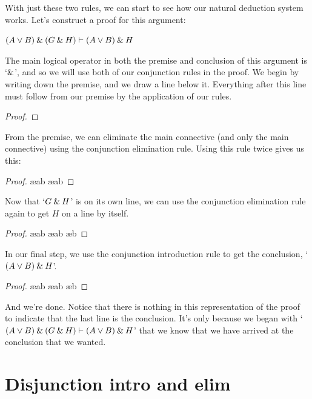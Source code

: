 With just these two rules, we can start to see how our natural deduction system works. Let's construct a proof for this argument: 
\begin{earg}
\item[] $(A\vee B) \mathbin{\&} (G \mathbin{\&} H) \vdash (A\vee B)\mathbin{\&} H$
\end{earg}
The main logical operator in both the premise and conclusion of this argument is `$\mathbin{\&}$', and so we will use both of our conjunction rules in the proof. We begin by writing down the premise, and we draw a line below it. Everything after this line must follow from our premise by the application of our rules. 
\begin{proof}
	 \pr{}
\end{proof}
From the premise, we can eliminate the main connective (and only the main connective) using the conjunction elimination rule. Using this rule twice gives us this:
\begin{proof}
	 \pr{}
	 \ae{ab}
	 \ae{ab}
\end{proof}
Now that `$G\mathbin{\&} H$' is on its own line, we can use the conjunction elimination rule again to get $H$ on a line by itself. 
\begin{proof}
	 \pr{}
	 \ae{ab}
	 \ae{ab}
	 \ae{b}
\end{proof}
In our final step, we use the conjunction introduction rule to get the conclusion, `$(A\vee B)\mathbin{\&} H$'.
\begin{proof}
	 \pr{}
	 \ae{ab}
	 \ae{ab}
	 \ae{b}
	 
\end{proof}
And we're done. Notice that there is nothing in this representation of the proof to indicate that the last line is the conclusion. It's only because we began with `$(A\vee B) \mathbin{\&} (G \mathbin{\&} H) \vdash (A\vee B)\mathbin{\&} H$' that we know that we have arrived at the conclusion that we wanted.
 

\section{Disjunction intro and elim}\label{s:disj-rule}



